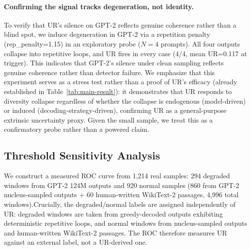 \documentclass[11pt]{article}
\begin{document}
\paragraph{Confirming the signal tracks degeneration, not identity.} To verify that UR's silence on GPT-2 reflects genuine coherence rather than a blind spot, we induce degeneration in GPT-2 via a repetition penalty (rep\_penalty=1.15) in an exploratory probe ($N=4$ prompts). All four outputs collapse into repetitive loops, and UR fires in every case (4/4, mean UR=0.117 at trigger). This indicates that GPT-2's silence under clean sampling reflects genuine coherence rather than detector failure. We emphasize that this experiment serves as a stress test rather than a proof of UR's efficacy (already established in Table~\ref{tab:main-result}): it demonstrates that UR responds to diversity collapse regardless of whether the collapse is endogenous (model-driven) or induced (decoding-strategy-driven), confirming UR as a general-purpose extrinsic uncertainty proxy. Given the small sample, we treat this as a confirmatory probe rather than a powered claim.

\subsection{Threshold Sensitivity Analysis}
\label{sec:threshold-sensitivity}

We construct a measured ROC curve from 1,214 real samples: 294 degraded windows from GPT-2 124M outputs and 920 normal samples (860 from GPT-2 nucleus-sampled outputs + 60 human-written WikiText-2 passages, 4,996 total windows).Crucially, the degraded/normal labels are assigned independently of UR: degraded windows are taken from greedy-decoded outputs exhibiting deterministic repetitive loops, and normal windows from nucleus-sampled outputs and human-written WikiText-2 passages. The ROC therefore measures UR against an external label, not a UR-derived one.

\begin{table}[t]
\centering
\caption{Measured ROC sensitivity over UR $\in$ [0.24, 0.40]. $^*$Youden's $J$ optimum = 0.32. We choose 0.30 at the TPR knee (0.847 $\to$ 0.993), sacrificing 0.7\% TPR for lower FPR. Thresholds 0.20--0.40 all yield TPR $\ge$ 0.847 and FPR $\le$ 0.048.}
\label{tab:roc}
\end{table}
\end{document}
